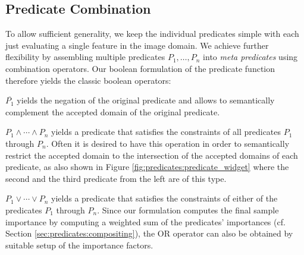 \subsection{Predicate Combination}
To allow sufficient generality, we keep the individual predicates simple with each just evaluating a single feature in the image domain. 
We achieve further flexibility by assembling multiple predicates $P_1, \ldots, P_n$ into \emph{meta predicates} using combination operators. 
Our boolean formulation of the predicate function therefore yields the classic boolean operators:
\begin{my_list_desc}
	\item[NOT:] 
		$\overline{P_1}$ yields the negation of the original predicate and allows to semantically complement the accepted domain of the original predicate. 
	
	\item[AND:] 
		$P_1 \land \cdots \land P_n$ yields a predicate that satisfies the constraints of all predicates $P_1$ through $P_n$. 
		Often it is desired to have this operation in order to semantically restrict the accepted domain to the intersection of the accepted domains of each predicate, as also shown in Figure \ref{fig:predicates:predicate_widget} where the second and the third predicate from the left are of this type. 
	
	\item[OR:] 
		$P_1 \lor \cdots \lor P_n$ yields a predicate that satisfies the constraints of either of the predicates $P_1$ through $P_n$. 
		Since our formulation computes the final sample importance by computing a weighted sum of the predicates' importances (cf. Section \ref{sec:predicates:compositing}), the OR operator can also be obtained by suitable setup of the importance factors. 
\end{my_list_desc}



